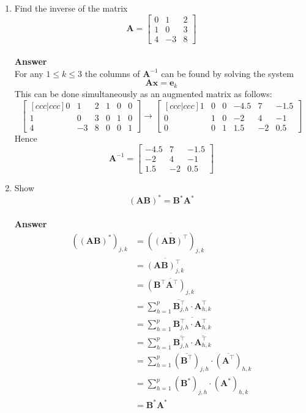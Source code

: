 \documentclass[11pt]{article}
\newcommand{\cj}{\overline}
\newcommand{\tb}{\textbf}
\theoremstyle{definition}
\begin{document}
\begin{enumerate}
	\item Find the inverse of the matrix
	\begin{equation*}
		\tb{A} = \begin{bmatrix} 0 & 1 & 2 \\ 1 & 0 & 3 \\ 4 & -3 & 8 \end{bmatrix}
	\end{equation*}
        \\
        \textbf{Answer}
        \\
        For any $1 \leq k \leq 3$ the columns of $\tb{A}^{-1}$ can be found by solving the system
	\begin{equation*}
		\tb{A} \tb{x} = \tb{e}_k
	\end{equation*}
	This can be done simultaneously as an augmented matrix as 
    follows: 
	\begin{equation*}
		\begin{bmatrix}[ccc|ccc] 0 & 1 & 2 & 1 & 0 & 0 \\ 1 & 0 & 3& 0 & 1 & 0 \\ 4 & -3 & 8 & 0 & 0 & 1 \end{bmatrix} \longrightarrow \begin{bmatrix}[ccc|ccc] 1 & 0 & 0 & -4.5 & 7 & -1.5 \\ 0 & 1 & 0 & -2 & 4 & -1 \\ 0 & 0 & 1 & 1.5 & -2 & 0.5 \end{bmatrix}
	\end{equation*}
    Hence
    \begin{equation*}
    \tb{A}^{-1} = \begin{bmatrix} -4.5 & 7 & -1.5 \\ -2 & 4 & -1 \\ 1.5 & -2 & 0.5 \end{bmatrix}
    \end{equation*}

    \item Show
    \[(\tb{A} \tb{B})^\ast = \tb{B}^\ast \tb{A}^\ast\]
    \\
        \textbf{Answer}
    \\
    \begin{align*}
		((\tb{A} \tb{B})^\ast)_{j,k}
            & = (\cj{(\tb{A} \tb{B})^{\top}})_{j,k} \\
            & = \cj{(\tb{A} \tb{B})^{\top}_{j,k}} \\
            & = \cj{(\tb{B}^{\top} \tb{A}^{\top} )_{j,k}} \\
            & = \cj{\sum_{h=1}^p\tb{B}^{\top}_{j,h}\cdot \tb{A}^{\top}_{h,k}} \\
            & = \sum_{h=1}^p\cj{\tb{B}^{\top}_{j,h}\cdot \tb{A}^{\top}_{h,k}} \\
            & = \sum_{h=1}^p\cj{\tb{B}^{\top}_{j,h}} \cdot \cj{\tb{A}^{\top}_{h,k}} \\ 
            & = \sum_{h=1}^p(\cj{\tb{B}^{\top}})_{j,h} \cdot (\cj{\tb{A}^{\top}})_{h,k} \\
            & = \sum_{h=1}^p(\tb{B}^\ast)_{j,h} \cdot (\tb{A}^\ast)_{h,k} \\
            & = \tb{B}^\ast \tb{A}^\ast
		\end{align*}

\end{enumerate}
\end{document}
